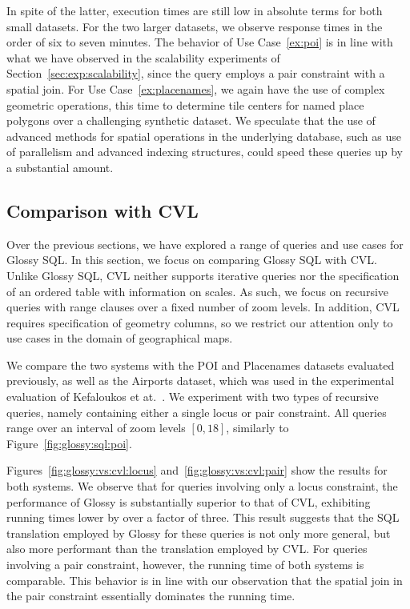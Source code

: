 \documentclass[11pt, oneside]{report}
\begin{document}
{In spite of the latter, execution times are still low in absolute terms for both small datasets. For the two larger datasets, we observe response times in the order of six to seven minutes. The behavior of Use Case~\ref{ex:poi} is in line with what we have observed in the scalability experiments of Section~\ref{sec:exp:scalability}, since the query employs a pair constraint with a spatial join. For Use Case~\ref{ex:placenames}, we again have the use of complex geometric operations, this time to determine tile centers for named place polygons over a challenging synthetic dataset. We speculate that the use of advanced methods for spatial operations in the underlying database, such as use of parallelism and advanced indexing structures, could speed these queries up by a substantial amount. 

\subsection{Comparison with CVL}

Over the previous sections, we have explored a range of queries and use cases for Glossy SQL. In this section, we focus on comparing Glossy SQL with CVL. Unlike Glossy SQL, CVL neither supports iterative queries nor the specification of an ordered table with information on scales. As such, we focus on recursive queries with range clauses over a fixed number of zoom levels. In addition, CVL requires specification of geometry columns, so we restrict our attention only to use cases in the domain of geographical maps. 

We compare the two systems with the POI and Placenames datasets evaluated previously, as well as the Airports dataset, which was used in the experimental evaluation of Kefaloukos et at.~\cite{KefaloukosSZ14:CVL}. We experiment with two types of recursive queries, namely containing either a single locus or pair constraint. All queries range over an interval of zoom levels $[0,18]$, similarly to Figure~\ref{fig:glossy:sql:poi}. 

Figures~\ref{fig:glossy:vs:cvl:locus} and~\ref{fig:glossy:vs:cvl:pair} show the results for both systems. We observe that for queries involving only a locus constraint, the performance of Glossy is substantially superior to that of CVL, exhibiting running times lower by over a factor of three. This result suggests that the SQL translation employed by Glossy for these queries is not only more general, but also more performant than the translation employed by CVL. For queries involving a pair constraint, however, the running time of both systems is comparable. This behavior is in line with our observation that the spatial join in the pair constraint essentially dominates the running time.        

}
\end{document}
